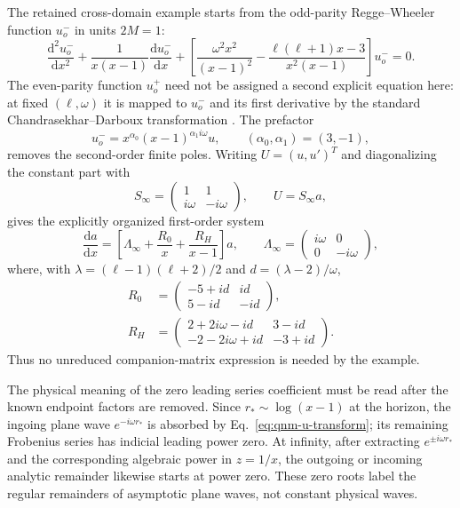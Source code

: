 \documentclass[11pt]{article}
\newcommand{\dd}{\mathrm d}
\begin{document}
The retained cross-domain example starts from the odd-parity Regge--Wheeler function
$u^-_o$ in units $2M=1$:
\begin{equation}
 \frac{\dd^2u^-_o}{\dd x^2}
 +\frac{1}{x(x-1)}\frac{\dd u^-_o}{\dd x}
 +\left[\frac{\omega^2x^2}{(x-1)^2}
 -\frac{\ell(\ell+1)x-3}{x^2(x-1)}\right]u^-_o=0.
 \label{eq:qnm-original-rw}
\end{equation}
The even-parity function $u^+_o$ need not be assigned a second explicit equation here: at
fixed $(\ell,\omega)$ it is mapped to $u^-_o$ and its first derivative by the standard
Chandrasekhar--Darboux transformation \cite{Glampedakis:2017rar}.  The prefactor
\begin{equation}
 u^-_o=x^{\alpha_0}(x-1)^{\alpha_1 i\omega}u,
 \qquad (\alpha_0,\alpha_1)=(3,-1),
 \label{eq:qnm-u-transform}
\end{equation}
removes the second-order finite poles.  Writing $U=(u,u')^T$ and diagonalizing the constant
part with
\begin{equation}
 S_\infty=\begin{pmatrix}1&1\\ i\omega&-i\omega\end{pmatrix},
 \qquad U=S_\infty a,
\end{equation}
gives the explicitly organized first-order system
\begin{equation}
 \frac{\dd a}{\dd x}=\left[\Lambda_\infty+
 \frac{R_0}{x}+\frac{R_H}{x-1}\right]a,
 \qquad \Lambda_\infty=\begin{pmatrix}i\omega&0\\0&-i\omega\end{pmatrix},
 \label{eq:qnm-diagonal-system}
\end{equation}
where, with $\lambda=(\ell-1)(\ell+2)/2$ and $d=(\lambda-2)/\omega$,
\begin{align}
 R_0&=\begin{pmatrix}-5+id&id\\5-id&-id\end{pmatrix},\\
 R_H&=\begin{pmatrix}2+2i\omega-id&3-id\\-2-2i\omega+id&-3+id\end{pmatrix}.
 \label{eq:qnm-residue-matrices}
\end{align}
Thus no unreduced companion-matrix expression is needed by the example.

The physical meaning of the zero leading series coefficient must be read after the known
endpoint factors are removed.  Since $r_*\sim\log(x-1)$ at the horizon, the ingoing plane
wave $e^{-i\omega r_*}$ is absorbed by Eq.~\eqref{eq:qnm-u-transform}; its remaining
Frobenius series has indicial leading power zero.  At infinity, after extracting
$e^{\pm i\omega r_*}$ and the corresponding algebraic power in $z=1/x$, the outgoing or
incoming analytic remainder likewise starts at power zero.  These zero roots label the
regular remainders of asymptotic plane waves, not constant physical waves.
\end{document}
